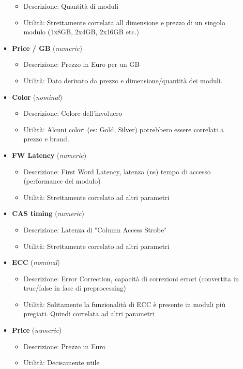 \documentclass[12pt]{report}
\begin{document}
\begin{itemize}
\begin{itemize}
			\item Descrizione: Quantità di moduli
			\item Utilità: Strettamente correlata all dimensione e prezzo di un singolo modulo (1x8GB, 2x4GB, 2x16GB etc.)
		\end{itemize}
	\item \textbf{Price / GB} (\textit{numeric})
		\begin{itemize}
			\item Descrizione: Prezzo in Euro per un GB
			\item Utilità: Dato derivato da prezzo e dimensione/quantità dei moduli.
		\end{itemize}
	\item \textbf{Color} (\textit{nominal})
		\begin{itemize}
			\item Descrizione: Colore dell'involucro
			\item Utilità: Alcuni colori (es: Gold, Silver) potrebbero essere correlati a prezzo e brand.
		\end{itemize}
	\item \textbf{FW Latency} (\textit{numeric})
		\begin{itemize}
			\item Descrizione: First Word Latency, latenza (ns) tempo di accesso (performance del modulo)
			\item Utilità: Strettamente correlato ad altri parametri
		\end{itemize}
	\item \textbf{CAS timing} (\textit{numeric})
		\begin{itemize}
			\item Descrizione: Latenza di "Column Access Strobe"
			\item Utilità: Strettamente correlato ad altri parametri
		\end{itemize}
	\item \textbf{ECC} (\textit{nominal})
		\begin{itemize}
			\item Descrizione: Error Correction, capacità di correzioni errori (convertita in true/false in fase di preprocessing)
			\item Utilità: Solitamente la funzionalità di ECC è presente in moduli più pregiati. Quindi correlata ad altri parametri
		\end{itemize}
	\item \textbf{Price} (\textit{numeric})
		\begin{itemize}
			\item Descrizione: Prezzo in Euro
			\item Utilità: Decisamente utile
		\end{itemize}
\end{itemize}
\end{document}
